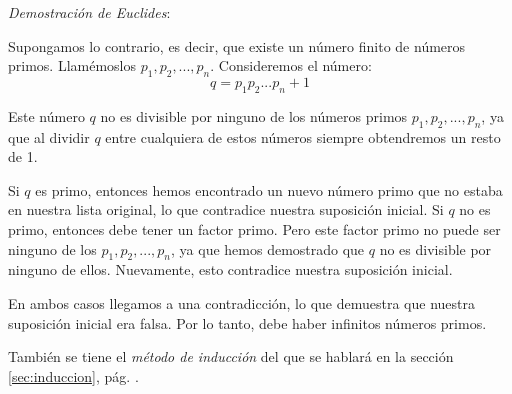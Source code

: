 \begin{enumerate}[label=\roman*)]
\begin{enumerate}[label=\alph*)]
\begin{fmd-example}
			\textit{Demostración de Euclides}:
			
			Supongamos lo contrario, es decir, que existe un número finito de números primos. Llamémoslos $p_1, p_2, ..., p_n$. Consideremos el número:
			$$q = p_1p_2...p_n + 1$$
			
			Este número $q$ no es divisible por ninguno de los números primos $p_1, p_2, ..., p_n$, ya que al dividir $q$ entre cualquiera de estos números siempre obtendremos un resto de 1. 
			
			Si $q$ es primo, entonces hemos encontrado un nuevo número primo que no estaba en nuestra lista original, lo que contradice nuestra suposición inicial. Si $q$ no es primo, entonces debe tener un factor primo. Pero este factor primo no puede ser ninguno de los $p_1, p_2, ..., p_n$, ya que hemos demostrado que $q$ no es divisible por ninguno de ellos. Nuevamente, esto contradice nuestra suposición inicial.
			
			En ambos casos llegamos a una contradicción, lo que demuestra que nuestra suposición inicial era falsa. Por lo tanto, debe haber infinitos números primos.
		\end{fmd-example}
	\end{enumerate}
\end{enumerate}

\begin{lgnote}
También se tiene el \textit{método de inducción} del que se hablará en la sección \ref{sec:induccion}, pág. \pageref{sec:induccion}.
\end{lgnote}

